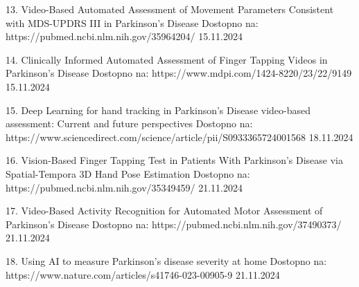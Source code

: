 13. Video-Based Automated Assessment of Movement Parameters Consistent with MDS-UPDRS III in Parkinson's Disease
Dostopno na: https://pubmed.ncbi.nlm.nih.gov/35964204/
15.11.2024

14. Clinically Informed Automated Assessment of Finger Tapping Videos in Parkinson’s Disease
Dostopno na: https://www.mdpi.com/1424-8220/23/22/9149
15.11.2024

15. Deep Learning for hand tracking in Parkinson’s Disease video-based assessment: Current and future perspectives
Dostopno na: https://www.sciencedirect.com/science/article/pii/S0933365724001568
18.11.2024

16. Vision-Based Finger Tapping Test in Patients With Parkinson’s Disease via Spatial-Tempora 3D Hand Pose Estimation
Dostopno na: https://pubmed.ncbi.nlm.nih.gov/35349459/
21.11.2024

17. Video-Based Activity Recognition for Automated Motor Assessment of Parkinson’s Disease
Dostopno na: https://pubmed.ncbi.nlm.nih.gov/37490373/
21.11.2024

18. Using AI to measure Parkinson’s disease severity at home
Dostopno na: https://www.nature.com/articles/s41746-023-00905-9
21.11.2024

